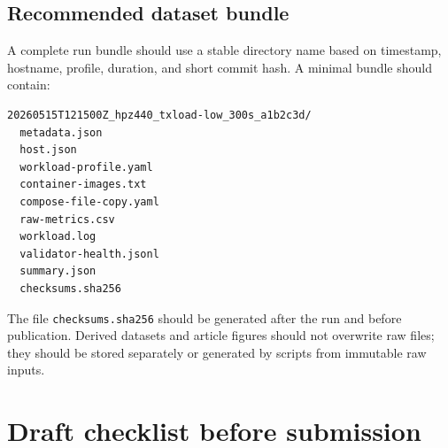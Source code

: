 \documentclass[11pt,a4paper]{article}
\begin{document}
\subsection{Recommended dataset bundle}
\label{app:dataset-bundle}

A complete run bundle should use a stable directory name based on timestamp, hostname, profile, duration, and short commit hash. A minimal bundle should contain:

\begin{verbatim}
20260515T121500Z_hpz440_txload-low_300s_a1b2c3d/
  metadata.json
  host.json
  workload-profile.yaml
  container-images.txt
  compose-file-copy.yaml
  raw-metrics.csv
  workload.log
  validator-health.jsonl
  summary.json
  checksums.sha256
\end{verbatim}

The file \texttt{checksums.sha256} should be generated after the run and before publication. Derived datasets and article figures should not overwrite raw files; they should be stored separately or generated by scripts from immutable raw inputs.

\section{Draft checklist before submission}
\label{app:checklist}
\end{document}
